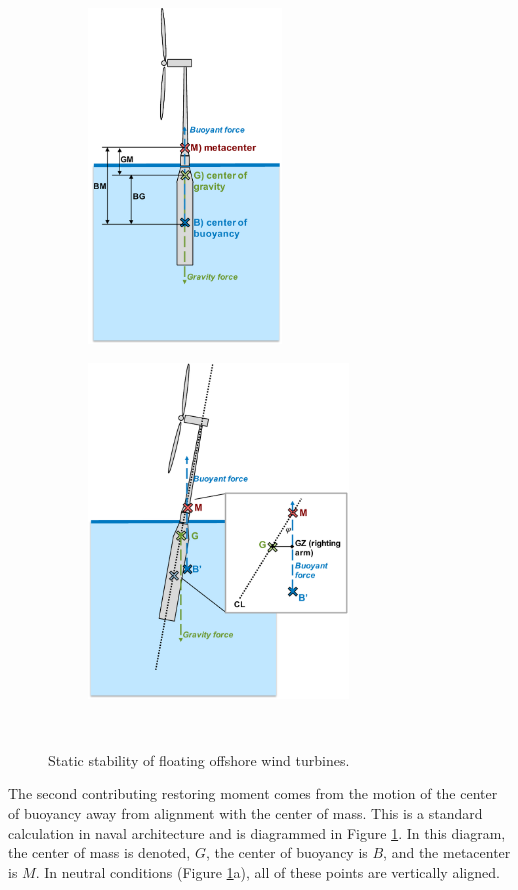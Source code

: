 \begin{figure}[htb]
  \begin{subfigure}[b]{0.49\linewidth}
    \centering \includegraphics[height=3.5in]{figs/metacenterA.pdf}
    \caption{}
  \end{subfigure}
  \begin{subfigure}[b]{0.49\linewidth}
    \centering \includegraphics[height=3.5in]{figs/metacenterB.pdf}
    \caption{}
  \end{subfigure}\\
  \caption{Static stability of floating offshore wind turbines.}
  \label{fig:metacenter}
\end{figure}

The second contributing restoring moment comes from the motion of the
center of buoyancy away from alignment with the center of mass.  This is
a standard calculation in naval architecture \citep{thiagarajan2014} and is
diagrammed in Figure \ref{fig:metacenter}.  In this diagram, the center
of mass is denoted, $G$, the center of buoyancy is $B$, and the
metacenter is $M$.  In neutral conditions (Figure \ref{fig:metacenter}a),
all of these points are vertically aligned.

